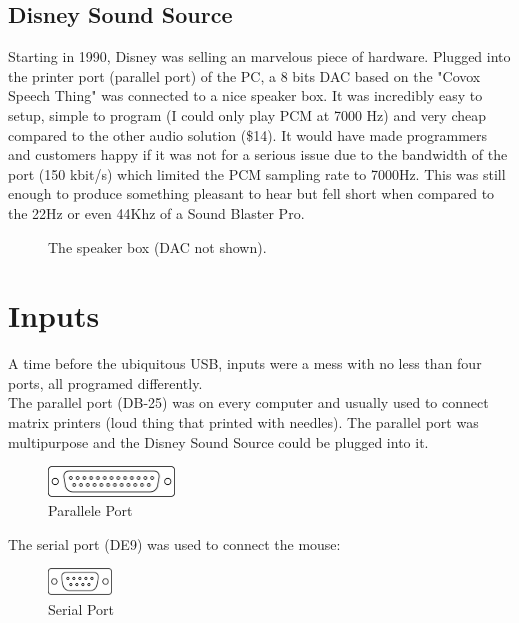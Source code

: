 \documentclass[book.tex]{subfiles}
\begin{document}
  \subsection{Disney Sound Source}
  Starting in 1990, Disney was selling an marvelous piece of hardware. Plugged into the printer port (parallel port) of the PC, a 8 bits DAC based on the "Covox Speech Thing" was connected to a nice speaker box. It was incredibly easy to setup, simple to program (I could only play PCM at 7000 Hz) and very cheap compared to the other audio solution (\$14). It would have made programmers and customers happy if it was not for a serious issue due to the bandwidth of the port (150 kbit/s) which limited the PCM sampling rate to 7000Hz.  This was still enough to produce something pleasant to hear but fell short when compared to the 22Hz or even 44Khz of a Sound Blaster Pro.
  \par
  \begin{figure}[H] 
    \centering 
    \caption{The speaker box (DAC not shown).}
  \end{figure}








\section{Inputs}
A time before the ubiquitous USB, inputs were a mess with no less than four ports, all programed differently.\\

The parallel port (DB-25) was on every computer and usually used to connect matrix printers (loud thing that printed with needles). The parallel port was multipurpose and the Disney Sound Source could be plugged into it.\\
\par
 \begin{figure}[H]
\centering
\includegraphics[width=0.3\textwidth]{imgs/drawings/ports/DB-25_parallel_port.eps}
\caption{Parallele Port}
\label{fig:parallelPort}
\end{figure}


The serial port (DE9) was used to connect the mouse:
 \begin{figure}[H]
\centering
\includegraphics[width=0.15\textwidth]{imgs/drawings/ports/DE9_serial_port.eps}
\caption{Serial Port}
\label{fig:serialPort}
\end{figure}
\end{document}
